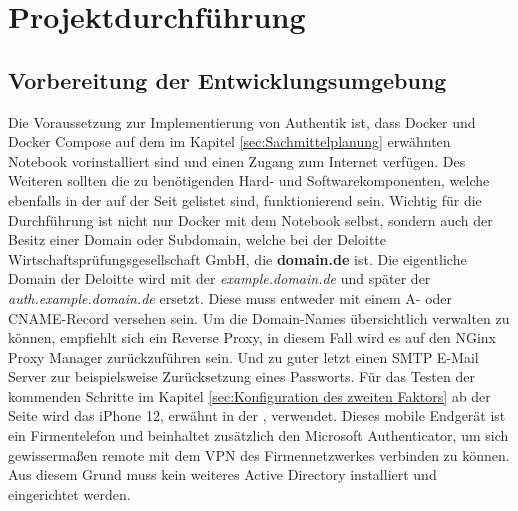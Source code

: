 \section{Projektdurchführung} 
\label{sec:Projektdurchführung}

\subsection{Vorbereitung der Entwicklungsumgebung}
\label{sec:Vorbereitung der Entwicklungsumgebung}
Die Voraussetzung zur Implementierung von Authentik ist, dass Docker und Docker Compose auf dem im Kapitel \ref{sec:Sachmittelplanung} 
 erwähnten Notebook vorinstalliert sind und einen Zugang zum Internet verfügen. Des Weiteren sollten die zu 
benötigenden Hard- und Softwarekomponenten, welche ebenfalls in der  auf der Seit \pageref{sec:Sachmittelplanung} 
gelistet sind, funktionierend sein. Wichtig für die Durchführung ist nicht nur Docker mit dem Notebook selbst, sondern auch der 
Besitz einer Domain oder Subdomain, welche bei der Deloitte Wirtschaftsprüfungsgesellschaft GmbH, die \textbf{domain.de} ist. 
Die eigentliche Domain der Deloitte wird mit der \textit{example.domain.de} und später der \textit{auth.example.domain.de} ersetzt.
Diese muss entweder mit einem A- oder CNAME-Record versehen sein. Um die Domain-Names übersichtlich verwalten zu können, 
empfiehlt sich ein Reverse Proxy, in diesem Fall wird es auf den NGinx Proxy Manager zurückzuführen sein. Und zu guter letzt einen SMTP 
E-Mail Server zur beispielsweise Zurücksetzung eines Passworts. Für das Testen der kommenden Schritte im Kapitel 
\ref{sec:Konfiguration des zweiten Faktors}  ab der Seite 
\pageref{sec:Konfiguration des zweiten Faktors} wird das iPhone 12, erwähnt in der , verwendet. 
Dieses mobile Endgerät ist ein Firmentelefon und beinhaltet zusätzlich den Microsoft Authenticator, um sich 
gewissermaßen remote mit dem VPN des Firmennetzwerkes verbinden zu können. Aus diesem Grund muss kein weiteres Active Directory 
installiert und eingerichtet werden.

